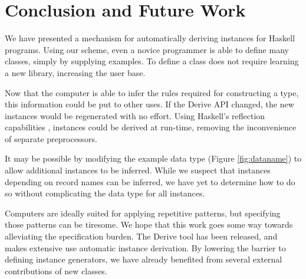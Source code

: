 \documentclass{llncs}
\begin{document}
\section{Conclusion and Future Work}
\label{sec:conclusion}

We have presented a mechanism for automatically deriving instances for Haskell programs. Using our scheme, even a novice programmer is able to define many classes, simply by supplying examples. To define a class does not require learning a new library, increasing the user base.

Now that the computer is able to infer the rules required for constructing a type, this information could be put to other uses. If the Derive API changed, the new instances would be regenerated with no effort. Using Haskell's reflection capabilities \cite{lammel:syb2}, instances could be derived at run-time, removing the inconvenience of separate preprocessors.

It may be possible by modifying the example data type (Figure \ref{fig:dataname}) to allow additional instances to be inferred. While we suspect that instances depending on record names can be inferred, we have yet to determine how to do so without complicating the data type for all instances.

Computers are ideally suited for applying repetitive patterns, but specifying those patterns can be tiresome. We hope that this work goes some way towards alleviating the specification burden. The Derive tool has been released, and makes extensive use automatic instance derivation. By lowering the barrier to defining instance generators, we have already benefited from several external contributions of new classes.



\end{document}
